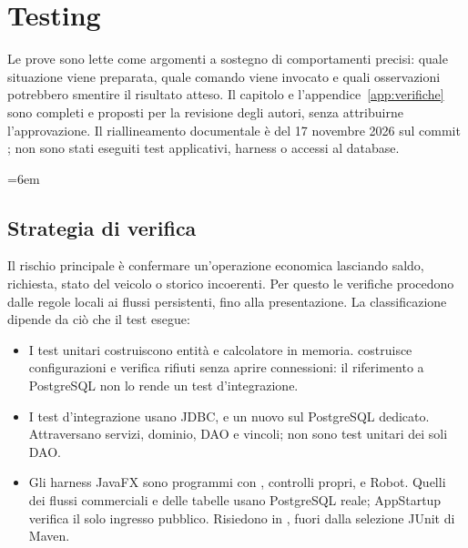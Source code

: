 \chapter{Testing}\label{ch:testing}
Le prove sono lette come argomenti a sostegno di comportamenti precisi:
quale situazione viene preparata, quale comando viene invocato e quali
osservazioni potrebbero smentire il risultato atteso. Il capitolo e
l'appendice~\ref{app:verifiche} sono completi e proposti per la revisione
degli autori, senza attribuirne l'approvazione.
Il riallineamento documentale è del 17 novembre 2026 sul commit ;
non sono stati eseguiti test applicativi, harness o accessi al database.

\begingroup
\def\UrlBreaks{\do\a\do\b\do\c\do\d\do\e\do\f\do\g\do\h\do\i\do\j\do\k\do\l\do\m\do\n\do\o\do\p\do\q\do\r\do\s\do\t\do\u\do\v\do\w\do\x\do\y\do\z\do\A\do\B\do\C\do\D\do\E\do\F\do\G\do\H\do\I\do\J\do\K\do\L\do\M\do\N\do\O\do\P\do\Q\do\R\do\S\do\T\do\U\do\V\do\W\do\X\do\Y\do\Z}
\emergencystretch=6em
\renewcommand{\lstlistingname}{Frammento}

\section{Strategia di verifica}\label{sec:test-strategia}
Il rischio principale è confermare un'operazione economica lasciando saldo,
richiesta, stato del veicolo o storico incoerenti. Per questo le verifiche
procedono dalle regole locali ai flussi persistenti, fino alla presentazione.
La classificazione dipende da ciò che il test esegue:
\begin{itemize}
\item I test unitari costruiscono entità e calcolatore in memoria.
   costruisce configurazioni e verifica
  rifiuti senza aprire connessioni: il riferimento a PostgreSQL non lo
  rende un test d'integrazione.
\item I test d'integrazione usano JDBC,  e un
   nuovo sul PostgreSQL dedicato. Attraversano servizi,
  dominio, DAO e vincoli; non sono test unitari dei soli DAO.
\item Gli harness JavaFX sono programmi con , controlli propri,
   e Robot. Quelli dei flussi commerciali e delle tabelle
  usano PostgreSQL reale; AppStartup verifica il solo ingresso pubblico.
  Risiedono in , fuori dalla selezione JUnit di Maven.
\end{itemize}

